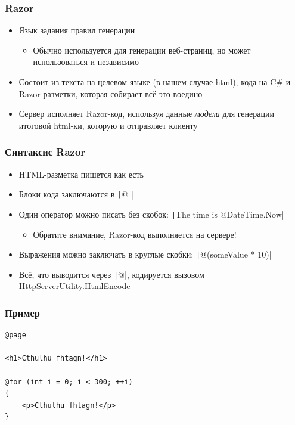 \documentclass{../../slides-style}
\begin{document}
    \begin{frame}
        \frametitle{Razor}
        \begin{itemize}
            \item Язык задания правил генерации
            \begin{itemize}
                \item Обычно используется для генерации веб-страниц, но может использоваться и независимо
            \end{itemize}
            \item Состоит из текста на целевом языке (в нашем случае html), кода на C\# и Razor-разметки, которая собирает всё это воедино
            \item Сервер исполняет Razor-код, используя данные \textit{модели} для генерации итоговой html-ки, которую и отправляет клиенту
        \end{itemize}
    \end{frame}

    \begin{frame}
        \frametitle{Синтаксис Razor}
        \begin{itemize}
            \item HTML-разметка пишется как есть
            \item Блоки кода заключаются в \texttt|@{ }|
            \item Один оператор можно писать без скобок: \texttt|The time is @DateTime.Now|
            \begin{itemize}
                \item Обратите внимание, Razor-код выполняется на сервере!
            \end{itemize}
            \item Выражения можно заключать в круглые скобки: \texttt|@(someValue * 10)|
            \item Всё, что выводится через \texttt|@|, кодируется вызовом HttpServerUtility.HtmlEncode
        \end{itemize}
    \end{frame}

    \begin{frame}[fragile]
        \frametitle{Пример}
        \begin{verbatim}
@page

<h1>Cthulhu fhtagn!</h1>

@for (int i = 0; i < 300; ++i)
{
    <p>Cthulhu fhtagn!</p>
}
        \end{verbatim}
    \end{frame}
\end{document}
